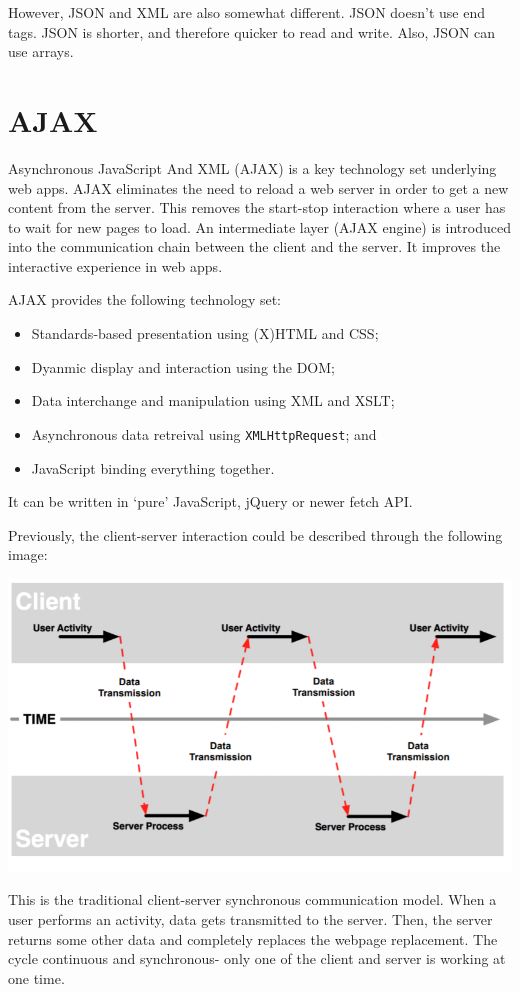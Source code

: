 \documentclass[a4paper, openany]{memoir}
\begin{document}
However, JSON and XML are also somewhat different. JSON doesn't use end tags. JSON is shorter, and therefore quicker to read and write. Also, JSON can use arrays.
\newpage

\section{AJAX}
Asynchronous JavaScript And XML (AJAX) is a key technology set underlying web apps. AJAX eliminates the need to reload a web server in order to get a new content from the server. This removes the start-stop interaction where a user has to wait for new pages to load. An intermediate layer (AJAX engine) is introduced into the communication chain between the client and the server. It improves the interactive experience in web apps.

AJAX provides the following technology set:
\begin{itemize}
    \item Standards-based presentation using (X)HTML and CSS;
    \item Dyanmic display and interaction using the DOM;
    \item Data interchange and manipulation using XML and XSLT;
    \item Asynchronous data retreival using \texttt{XMLHttpRequest}; and
    \item JavaScript binding everything together.
\end{itemize}
It can be written in `pure' JavaScript, jQuery or newer fetch API.

Previously, the client-server interaction could be described through the following image:
\begin{center}
    \includegraphics[scale=0.5]{src/L16I1.PNG}
\end{center}
This is the traditional client-server synchronous communication model. When a user performs an activity, data gets transmitted to the server. Then, the server returns some other data and completely replaces the webpage replacement. The cycle continuous and synchronous- only one of the client and server is working at one time.
\end{document}
